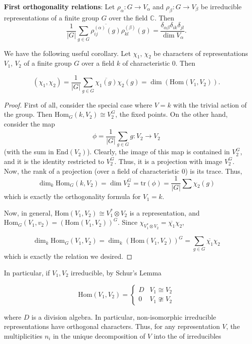 \documentclass[12pt]{article}
\newcommand{\C}{\mathbb{C}}
\newcommand{\Hom}[2]{\mathrm{Hom}(#1,#2)}
\begin{document}
\textbf{First orthogonality relations}:
Let $\rho_\alpha\colon G \to V_\alpha$ and $\rho_\beta\colon G \to V_\beta$ be irreducible representations of a finite group $G$ over the field $\C$.  Then
\[
\frac{1}{|G|}\sum_{g\in G}\overline{\rho^{(\alpha)}_{ij}(g)}\rho^{(\beta)}_{kl}(g)=\frac{\delta_{\alpha\beta}\delta_{ik}\delta_{jl}}{\dim V_\alpha}.
\]

We have the following useful corollary.
Let $\chi_1$, $\chi_2$ be characters of representations $V_1$, $V_2$ of a finite group $G$ over a field $k$ of characteristic $0$.  Then

$$(\chi_1,\chi_2)=\frac{1}{|G|}\sum_{g\in G}\overline{\chi_1(g)}\chi_2(g)=\dim(\Hom{V_1}{V_2}).$$

\begin{proof} 
First of all, consider the special case where $V=k$ with the trivial action
of the group.  Then $\mathrm{Hom}_G(k,V_2)\cong V_2^G$, the fixed points.
On the other hand, consider the map 
$$\phi=\frac{1}{|G|}\sum_{g\in G} g\colon V_2\to V_2$$ (with the sum in $\mathrm{End}(V_2)$).  Clearly,
the image of this map is contained in $V_2^G$, and it is the identity restricted
to $V_2^G$.  Thus, it is a projection with image $V_2^G$.  Now, the rank of
a projection (over a field of characteristic 0) is its trace.  Thus,
$$\dim_k \mathrm{Hom}_G(k,V_2)=\dim V_2^G=\mathrm{tr}(\phi)=
\frac{1}{|G|}\sum\chi_2(g)$$ which is exactly the orthogonality formula
for $V_1=k$.  

Now, in general, $\mathrm{Hom}(V_1,V_2)\cong V_1^*\otimes V_2$ is
a representation, and $\mathrm{Hom}_G(V_1,v_2)=(\mathrm{Hom}(V_1,V_2))^G$.  Since $\chi_{V^*_1\otimes V_2}=\overline{\chi_1}\chi_2$,

$$\dim_k\mathrm{Hom}_G(V_1,V_2)=\dim_k (\mathrm{Hom}(V_1,V_2))^G=
\sum_{g\in G}\overline{\chi_1}\chi_2$$
which is exactly the relation we desired.
\end{proof}

In particular, if $V_1, V_2$ irreducible, by Schur's Lemma

$$\Hom{V_1}{V_2}=\begin{cases} D &V_1\cong V_2\\ 0&V_1\ncong V_2\end{cases}$$

where $D$ is a division algebra.  In particular, non-isomorphic irreducible
representations have orthogonal characters.  Thus, for any representation $V$,
the multiplicities $n_i$ in the unique decomposition of $V$ into the 
of irreducibles
\end{document}
